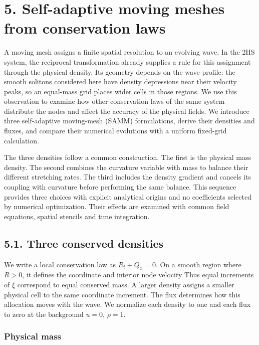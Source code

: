 \FloatBarrier
\section*{5. Self-adaptive moving meshes from conservation laws}

A moving mesh assigns a finite spatial resolution to an evolving wave. In the 2HS system, the reciprocal transformation already supplies a rule for this assignment through the physical density. Its geometry depends on the wave profile: the smooth solitons considered here have density depressions near their velocity peaks, so an equal-mass grid places wider cells in those regions. We use this observation to examine how other conservation laws of the same system distribute the nodes and affect the accuracy of the physical fields. We introduce three self-adaptive moving-mesh (SAMM) formulations, derive their densities and fluxes, and compare their numerical evolutions with a uniform fixed-grid calculation.

The three densities follow a common construction. The first is the physical mass density. The second combines the curvature variable with mass to balance their different stretching rates. The third includes the density gradient and cancels its coupling with curvature before performing the same balance. This sequence provides three choices with explicit analytical origins and no coefficients selected by numerical optimization. Their effects are examined with common field equations, spatial stencils and time integration.

\subsection*{5.1. Three conserved densities}

We write a local conservation law as \(R_t+Q_x=0\). On a smooth region where \(R>0\), it defines the coordinate and interior node velocity
Thus equal increments of \(\xi\) correspond to equal conserved mass. A larger density assigns a smaller physical cell to the same coordinate increment. The flux determines how this allocation moves with the wave. We normalize each density to one and each flux to zero at the background \(u=0\), \(\rho=1\).

\subsubsection*{Physical mass}

